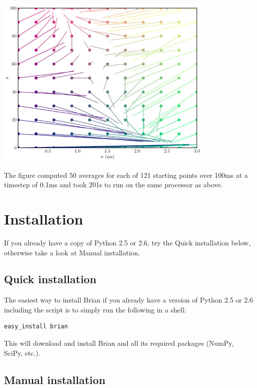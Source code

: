 \documentclass[letterpaper,10pt]{manual}
\begin{document}
\includegraphics{sfc-statespace.jpg}

The figure computed 50 averages for each of 121 starting points over 100ms at a timestep of 0.1ms and took
201s to run on the same processor as above.

\resetcurrentobjects


\chapter{Installation}

If you already have a copy of Python 2.5 or 2.6, try the Quick installation below,
otherwise take a look at Manual installation.


\section{Quick installation}

The easiest way to install Brian if you already have a version of Python 2.5 or 2.6 including the
 script is to simply run the following in a shell:

\begin{Verbatim}[commandchars=@\[\]]
easy_install brian
\end{Verbatim}

This will download and install Brian and all its required packages (NumPy, SciPy, etc.).


\section{Manual installation}
\end{document}
